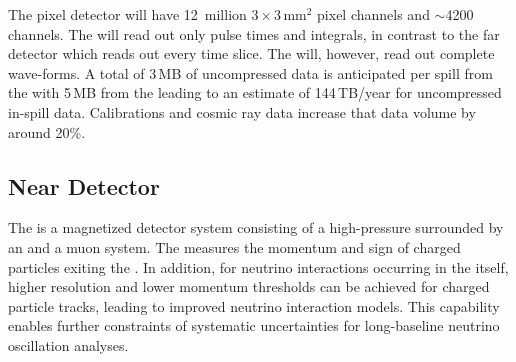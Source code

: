 \documentclass[../main-v1.tex]{subfiles}
\begin{document}
 The pixel  detector will have 12~million $3 \times 3$\,mm$^2$ pixel channels and $\sim$4200  channels.  The  will read out only pulse times and integrals, in contrast to the far detector which reads out every time slice.  The  will, however, read out complete wave-forms.   A total of 3\,MB of uncompressed data is anticipated per spill from the  with 5\,MB from the  leading to an estimate of 144\,TB/year for uncompressed in-spill data. Calibrations and cosmic ray data increase that data volume by around 20\%.




\subsection{Near Detector  }
\label{sec:comp-dataestimates-mpd}

The  is a magnetized detector system consisting of a high-pressure  surrounded by an  and a muon system. The  measures the momentum and sign of charged particles exiting the . In addition, for neutrino interactions occurring in the  itself, higher resolution and lower momentum thresholds can be achieved for charged particle tracks, leading to improved neutrino interaction models. This capability enables further constraints of systematic uncertainties for long-baseline neutrino  oscillation analyses.
\end{document}
